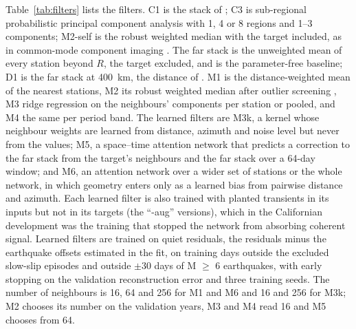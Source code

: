 \documentclass[preprint,12pt,authoryear]{elsarticle}
\begin{document}
Table~\ref{tab:filters} lists the filters. C1 is the stack of \citet{wdowinski1997}; C3 is sub-regional probabilistic principal component analysis \citep{tipping1999, gruszczynski2018, liu2026} with 1, 4 or 8 regions and 1--3 components; M2-self is the robust weighted median with the target included, as in common-mode component imaging \citep{tianshen2016, kreemer2021}. The far stack is the unweighted mean of every station beyond $R$, the target excluded, and is the parameter-free baseline; D1 is the far stack at 400~km, the distance of \citet{bachelot2025}. M1 is the distance-weighted mean of the nearest stations, M2 its robust weighted median after outlier screening \citep{kreemer2021}, M3 ridge regression on the neighbours' components per station or pooled, and M4 the same per period band. The learned filters are M3k, a kernel whose neighbour weights are learned from distance, azimuth and noise level but never from the values; M5, a space--time attention network that predicts a correction to the far stack from the target's neighbours and the far stack over a 64-day window; and M6, an attention network over a wider set of stations or the whole network, in which geometry enters only as a learned bias from pairwise distance and azimuth. Each learned filter is also trained with planted transients in its inputs but not in its targets (the ``-aug'' versions), which in the Californian development was the training that stopped the network from absorbing coherent signal. Learned filters are trained on quiet residuals, the residuals minus the earthquake offsets estimated in the fit, on training days outside the excluded slow-slip episodes and outside $\pm 30$ days of M $\ge$ 6 earthquakes, with early stopping on the validation reconstruction error and three training seeds. The number of neighbours is 16, 64 and 256 for M1 and M6 and 16 and 256 for M3k; M2 chooses its number on the validation years, M3 and M4 read 16 and M5 chooses from 64.
\end{document}
